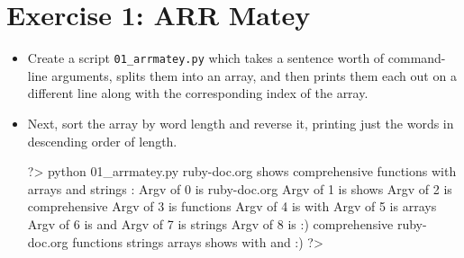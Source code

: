 \documentclass{42-en}
\begin{document}
\nextexercice
\newpage


\chapter{Exercise 1: ARR Matey}
\makeheaderfiles

\begin{itemize}

\item Create a script \texttt{01\_arrmatey.py} which takes a sentence worth of command-line arguments, splits them into an array, and then prints them each out on a different line along with the corresponding index of the array.
\item Next, sort the array by word length and reverse it, printing just the words in descending order of length.

\begin{42console}
	?> python 01_arrmatey.py ruby-doc.org shows comprehensive functions with arrays and strings :\)
	Argv of 0 is ruby-doc.org
	Argv of 1 is shows
	Argv of 2 is comprehensive
	Argv of 3 is functions
	Argv of 4 is with
	Argv of 5 is arrays
	Argv of 6 is and
	Argv of 7 is strings
	Argv of 8 is :)
	comprehensive
	ruby-doc.org
	functions
	strings
	arrays
	shows
	with
	and
	:)
	?>
\end{42console}

\end{itemize}

\nextexercice
\newpage

\end{document}
